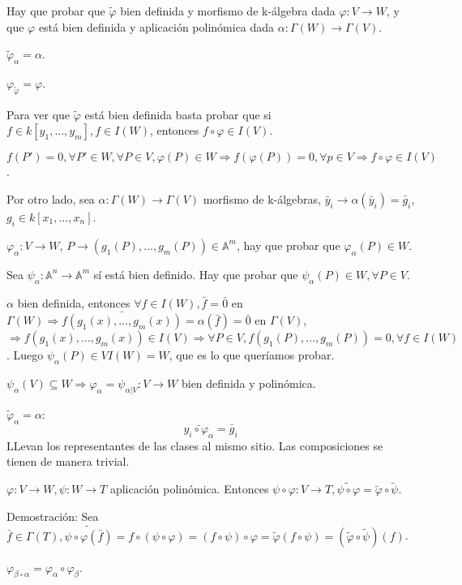 \begin{Dem}
Hay que probar que $\tilde{\varphi}$ bien definida y morfismo de k-álgebra dada $\varphi:V\rightarrow W$, y que $\varphi$ está bien definida y aplicación polinómica dada $\alpha: \Gamma(W)\rightarrow \Gamma(V)$.

$\tilde{\varphi}_\alpha = \alpha $.

$\varphi_{\tilde{\varphi}}=\varphi$. 

Para ver que $\tilde{\varphi}$ está bien definida basta probar que si $f\in k[y_1,\dots,y_m],f\in I(W)$, entonces $f\circ \varphi \in I(V)$.

$f(P')=0, \forall P'\in W, \forall P\in V,\varphi(P)\in W \Rightarrow f(\varphi(P))=0, \forall p\in V \Rightarrow f\circ \varphi\in I(V)$.

Por otro lado, sea $\alpha : \Gamma(W)\rightarrow \Gamma(V)$ morfismo de k-álgebras, $\bar{y}_i\rightarrow \alpha(\bar{y}_i)=\bar{g}_i$, $g_i\in k[x_1,\dots,x_n]$.

$\varphi_\alpha :V\rightarrow W$, $P\rightarrow (g_1(P),\dots,g_m(P))\in \mathbb{A}^m$, hay que probar que $\varphi_\alpha (P)\in W$.

Sea $\psi_\alpha:\mathbb{A}^n\rightarrow \mathbb{A}^m$ sí está bien definido. Hay que probar que $\psi_\alpha(P)\in W,\forall P\in V$.

$\alpha $ bien definida, entonces $\forall f \in I(W), \bar{f}=\bar{0}$ en $ \Gamma(W)\Rightarrow \bar{f(g_1(x),\dots,g_m(x))}=\alpha(\bar{f})=\bar{0}$ en $\Gamma(V)$, $\Rightarrow f(g_1(x),\dots,g_m(x))\in I(V)  \Rightarrow \forall P\in V, f(g_1(P),\dots,g_m(P))=0, \forall f\in I(W)$. Luego $\psi_\alpha(P)\in VI(W)=W$, que es lo que queríamos probar.

$\psi_\alpha(V)\subseteq W \Rightarrow \varphi_\alpha=\psi_{\alpha|V}:V\rightarrow W$ bien definida y polinómica.

$\tilde{\varphi}_\alpha = \alpha $:
$$\bar{y_i\circ \varphi_\alpha}=\bar{g}_i$$
LLevan los representantes de las clases al mismo sitio. Las composiciones se tienen de manera trivial.
\end{Dem}

\begin{nota}
$\varphi : V\rightarrow W, \psi: W \rightarrow T$ aplicación polinómica. Entonces $\psi\circ \varphi : V\rightarrow T, \tilde{\psi\circ \varphi}=\tilde{ \varphi}\circ \tilde{\psi}$.

Demostración: Sea $\bar{f}\in \Gamma(T), \tilde{\psi \circ \varphi (\bar{f})}=f\circ (\psi \circ \varphi)=(f\circ \psi)\circ \varphi = \tilde{\varphi}(f\circ \psi)=(\tilde{\varphi}\circ \tilde{\psi })(f)$.

$\varphi_{\beta \circ \alpha}=\varphi_\alpha \circ \varphi_\beta $.
\end{nota}

